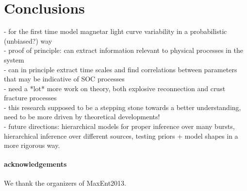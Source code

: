 \documentclass[12pt]{emulateapj}
\begin{document}
\section{Conclusions}

- for the first time model magnetar light curve variability in a probabilistic (unbiased?) way \\
- proof of principle: can extract information relevant to physical processes in the system \\
- can in principle extract time scales and find correlations between parameters that may be
indicative of SOC processes \\
- need a *lot* more work on theory, both explosive reconnection and crust fracture processes \\
- this research supposed to be a stepping stone towards a better understanding, need to be
more driven by theoretical developments! \\
- future directions: hierarchical models for proper inference over many bursts, hierarchical inference
over different sources, testing priors + model shapes in a more rigorous way.


\paragraph{acknowledgements}
We thank the organizers of MaxEnt2013.




\end{document}
